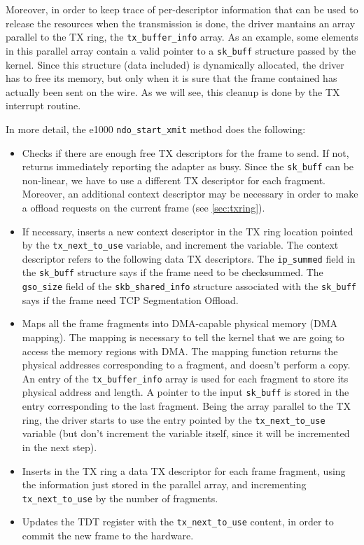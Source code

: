 Moreover, in order to keep trace of per-descriptor information that can be used to release the resources when the transmission is done, 
the driver mantains an array parallel to the TX ring, the \texttt{tx\_buffer\_info} array.
As an example, some elements in this parallel array contain a valid pointer to a \texttt{sk\_buff} structure passed by the kernel. Since
this structure (data included) is dynamically allocated, the driver has to free its memory, but only when it is sure that the frame 
contained has actually been sent on the wire. As we will see, this cleanup is done by the TX interrupt routine.

\vspace{0.5cm}

In more detail, the e1000 \texttt{ndo\_start\_xmit} method does the following:
\begin{itemize}
    \item Checks if there are enough free TX descriptors for the frame to send. If not, returns immediately reporting the adapter as busy.
          Since the \texttt{sk\_buff} can be non-linear, we have to use a different TX descriptor for each fragment. Moreover, an additional
	  context descriptor may be necessary in order to make a offload requests on the current frame (see \ref{sec:txring}).

    \item If necessary, inserts a new context descriptor in the TX ring location pointed by the \texttt{tx\_next\_to\_use} variable, and
	  increment the variable. The context descriptor refers to the following data TX descriptors.
	  The \texttt{ip\_summed} field in the \texttt{sk\_buff} structure says if the frame need to be checksummed. The \texttt{gso\_size}
	  field of the \texttt{skb\_shared\_info} structure associated with the \texttt{sk\_buff} says if the frame need TCP Segmentation
	  Offload.

    \item Maps all the frame fragments into DMA-capable physical memory (DMA mapping). The mapping is necessary to tell the kernel that
	  we are going to access the memory regions with DMA. The mapping function returns the physical addresses corresponding to a
	  fragment, and doesn't perform a copy. An entry of the \texttt{tx\_buffer\_info} array is used for each fragment to store
	  its physical address and length. A pointer to the input \texttt{sk\_buff} is stored in the entry corresponding to the last
	  fragment. Being the array parallel to the TX ring, the driver starts to use the entry pointed by the \texttt{tx\_next\_to\_use} 
	  variable (but don't increment the variable itself, since it will be incremented in the next step).
	  
    \item Inserts in the TX ring a data TX descriptor for each frame fragment, using the information just stored in the parallel array,
	  and incrementing \texttt{tx\_next\_to\_use} by the number of fragments.
	  
    \item Updates the TDT register with the \texttt{tx\_next\_to\_use} content, in order to commit the new frame to the hardware.
\end{itemize}

